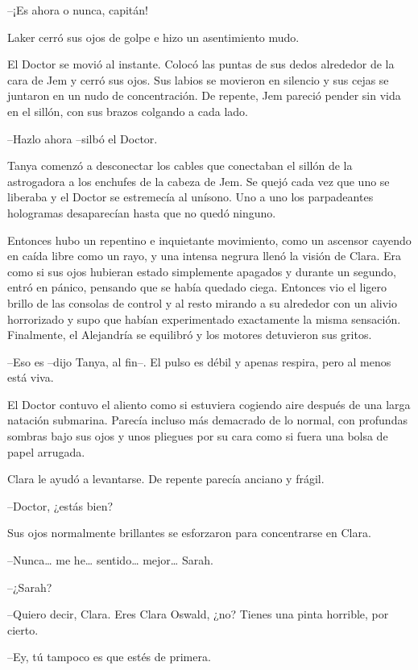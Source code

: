 {--¡Es ahora o nunca, capitán!}

{Laker cerró sus ojos de golpe e hizo un asentimiento mudo.}

{El Doctor se movió al instante. Colocó las puntas de sus dedos alrededor
 de la cara de Jem y cerró sus ojos. Sus labios se movieron en silencio y
 sus cejas se juntaron en un nudo de concentración. De repente, Jem
 pareció pender sin vida en el sillón, con sus brazos colgando a cada
lado.}

{--Hazlo ahora --silbó el Doctor.}

{Tanya comenzó a desconectar los cables que conectaban el sillón de la
 astrogadora a los enchufes de la cabeza de Jem. Se quejó cada vez que
 uno se liberaba y el Doctor se estremecía al unísono. Uno a uno los
parpadeantes hologramas desaparecían hasta que no quedó ninguno.}

{Entonces hubo un repentino e inquietante movimiento, como un ascensor
 cayendo en caída libre como un rayo, y una intensa negrura llenó la
 visión de Clara. Era como si sus ojos hubieran estado simplemente
 apagados y durante un segundo, entró en pánico, pensando que se había
 quedado ciega. Entonces vio el ligero brillo de las consolas de control
 y al resto mirando a su alrededor con un alivio horrorizado y supo que
 habían experimentado exactamente la misma sensación. Finalmente, el
Alejandría se equilibró y los motores detuvieron sus gritos.}

{--Eso es --dijo Tanya, al fin--. El pulso es débil y apenas respira,
pero al menos está viva.}

{El Doctor contuvo el aliento como si estuviera cogiendo aire después de
 una larga natación submarina. Parecía incluso más demacrado de lo
 normal, con profundas sombras bajo sus ojos y unos pliegues por su cara
como si fuera una bolsa de papel arrugada.}

{Clara le ayudó a levantarse. De repente parecía anciano y frágil.}

{--Doctor, ¿estás bien?}

{Sus ojos normalmente brillantes se esforzaron para concentrarse en
Clara.}

{--Nunca\ldots{} me he\ldots{} sentido\ldots{} mejor\ldots{} Sarah.}

{--¿Sarah?}

{--Quiero decir, Clara. Eres Clara Oswald, ¿no? Tienes una pinta
horrible, por cierto.}

{--Ey, tú tampoco es que estés de primera.}

